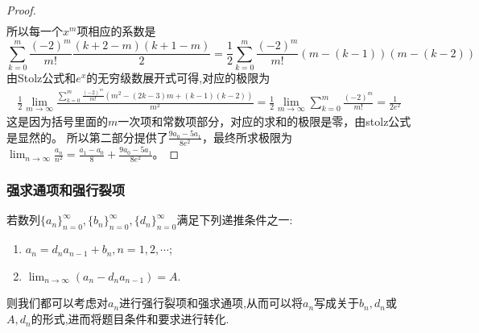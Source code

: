 \documentclass[../../main.tex]{subfiles}
\begin{document}
\begin{proof}
\begin{align*}
\end{align*}
所以每一个\(x^m\)项相应的系数是
\[
\sum_{k = 0}^{m}\frac{(-2)^m}{m!}\frac{(k + 2 - m)(k + 1 - m)}{2}=\frac{1}{2}\sum_{k = 0}^{m}\frac{(-2)^m}{m!}(m - (k - 1))(m - (k - 2))
\]
由Stolz公式和$e^x$的无穷级数展开式可得,对应的极限为
\begin{align*}
\frac{1}{2}\lim_{m\rightarrow\infty}\frac{\sum\limits_{k = 0}^{m}\frac{(-2)^m}{m!}(m^2-(2k - 3)m+(k - 1)(k - 2))}{m^2}
=\frac{1}{2}\lim_{m\rightarrow\infty}\sum_{k = 0}^{m}\frac{(-2)^m}{m!}=\frac{1}{2e^2}
\end{align*}
这是因为括号里面的\(m\)一次项和常数项部分，对应的求和的极限是零，由stolz公式是显然的。
所以第二部分提供了\(\frac{9a_0 - 5a_1}{8e^2}\)，最终所求极限为\(\lim_{n\rightarrow\infty}\frac{a_n}{n^2}=\frac{a_1 - a_0}{8}+\frac{9a_0 - 5a_1}{8e^2}\)。
\end{proof}





\subsubsection{强求通项和强行裂项}

若数列\(\{ a_n \}_{n = 0}^{\infty}, \{ b_n \}_{n = 0}^{\infty}, \{ d_n \}_{n = 0}^{\infty}\)满足下列递推条件之一:
\begin{enumerate}
\item \(a_n = d_na_{n - 1} + b_n, n = 1, 2, \cdots\);
\item \(\lim_{n\rightarrow \infty}(a_n - d_na_{n - 1}) = A\).
\end{enumerate}
则我们都可以考虑对\(a_n\)进行强行裂项和强求通项,从而可以将\(a_n\)写成关于\(b_n, d_n\)或\(A, d_n\)的形式,进而将题目条件和要求进行转化.
\end{document}
